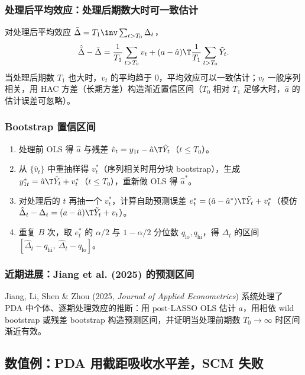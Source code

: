 \subsubsection{处理后平均效应：处理后期数大时可一致估计}

对处理后平均效应 $\bar\Delta=T_1\inv\sum_{t>T_0}\Delta_t$，
\[
\hat{\bar\Delta}-\bar\Delta=\frac1{T_1}\sum_{t>T_0}v_t+(a-\hat a)\T\frac1{T_1}\sum_{t>T_0}\tilde Y_t .
\]
当处理后期数 $T_1$ 也大时，$v_t$ 的平均趋于 0，平均效应可以一致估计；$v_t$ 一般序列相关，用 HAC 方差（长期方差）构造渐近置信区间（$T_0$ 相对 $T_1$ 足够大时，$\hat a$ 的估计误差可忽略）。

\subsubsection{Bootstrap 置信区间}

\begin{method}
\begin{enumerate}
  \item 处理前 OLS 得 $\hat a$ 与残差 $\hat v_t=y_{1t}-\hat a\T\tilde Y_t$（$t\le T_0$）。
  \item 从 $\{\hat v_t\}$ 中重抽样得 $v_t^*$（序列相关时用分块 bootstrap），生成 $y_{1t}^*=\hat a\T\tilde Y_t+v_t^*$（$t\le T_0$），重新做 OLS 得 $\hat a^*$。
  \item 对处理后的 $t$ 再抽一个 $v_t^*$，计算自助预测误差 $e_t^*=(\hat a-\hat a^*)\T\tilde Y_t+v_t^*$（模仿 $\hat\Delta_t-\Delta_t=(a-\hat a)\T\tilde Y_t+v_t$）。
  \item 重复 $B$ 次，取 $e_t^*$ 的 $\alpha/2$ 与 $1-\alpha/2$ 分位数 $q_{\mathrm{lo}},q_{\mathrm{hi}}$，得 $\Delta_t$ 的区间 $[\hat\Delta_t-q_{\mathrm{hi}},\ \hat\Delta_t-q_{\mathrm{lo}}]$。
\end{enumerate}
\end{method}

\subsubsection{近期进展：Jiang et al. (2025) 的预测区间}

Jiang, Li, Shen \& Zhou (2025, \emph{Journal of Applied Econometrics}) 系统处理了 PDA 中个体、逐期处理效应的推断：用 post-LASSO OLS 估计 $a$，用相依 wild bootstrap 或残差 bootstrap 构造预测区间，并证明当处理前期数 $T_0\to\infty$ 时区间渐近有效。

\subsection{数值例：PDA 用截距吸收水平差，SCM 失败}

